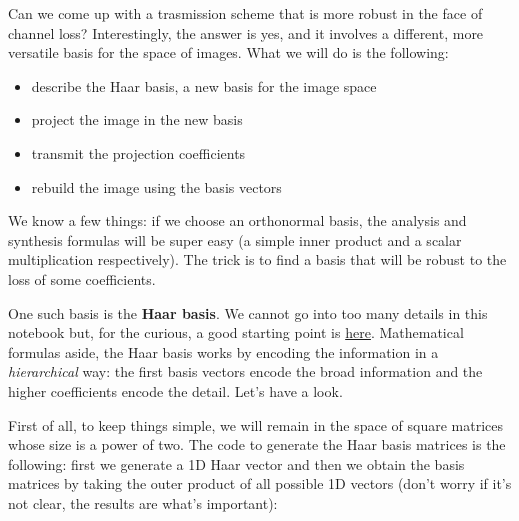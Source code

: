 \documentclass[11pt]{article}
\providecommand{\tightlist}{%
      \setlength{\itemsep}{0pt}\setlength{\parskip}{0pt}}
\begin{document}
    Can we come up with a trasmission scheme that is more robust in the face
of channel loss? Interestingly, the answer is yes, and it involves a
different, more versatile basis for the space of images. What we will do
is the following:

\begin{itemize}
\tightlist
\item
  describe the Haar basis, a new basis for the image space
\item
  project the image in the new basis
\item
  transmit the projection coefficients
\item
  rebuild the image using the basis vectors
\end{itemize}

We know a few things: if we choose an orthonormal basis, the analysis
and synthesis formulas will be super easy (a simple inner product and a
scalar multiplication respectively). The trick is to find a basis that
will be robust to the loss of some coefficients.

One such basis is the \textbf{Haar basis}. We cannot go into too many
details in this notebook but, for the curious, a good starting point is
\href{https://chengtsolin.wordpress.com/2015/04/15/real-time-2d-discrete-wavelet-transform-using-opengl-compute-shader/}{here}.
Mathematical formulas aside, the Haar basis works by encoding the
information in a \emph{hierarchical} way: the first basis vectors encode
the broad information and the higher coefficients encode the detail.
Let's have a look.

First of all, to keep things simple, we will remain in the space of
square matrices whose size is a power of two. The code to generate the
Haar basis matrices is the following: first we generate a 1D Haar vector
and then we obtain the basis matrices by taking the outer product of all
possible 1D vectors (don't worry if it's not clear, the results are
what's important):
\end{document}
